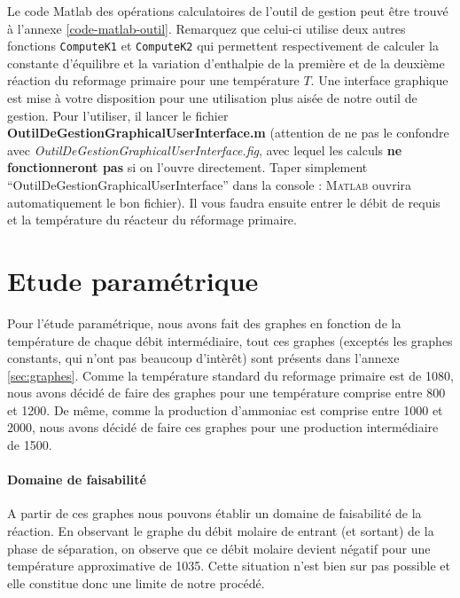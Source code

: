 Le code Matlab des opérations calculatoires de l'outil de gestion peut être trouvé à l'annexe \ref{code-matlab-outil}.
Remarquez que celui-ci utilise deux autres fonctions \lstinline{ComputeK1}
et \lstinline{ComputeK2} qui permettent respectivement de calculer la constante
d'équilibre et la variation d'enthalpie de la première et de la deuxième
réaction du reformage primaire pour une température $T$.
Une interface graphique est mise à votre disposition pour une utilisation plus aisée de notre outil de gestion.
Pour l'utiliser, il lancer le fichier \textbf{OutilDeGestionGraphicalUserInterface.m}
(attention de ne pas le confondre avec \textit{OutilDeGestionGraphicalUserInterface.fig},
avec lequel les calculs \textbf{ne fonctionneront pas} si on l'ouvre directement. Taper simplement
``OutilDeGestionGraphicalUserInterface'' dans la console : \textsc{Matlab}
ouvrira automatiquement le bon fichier). Il vous faudra ensuite entrer le débit de
 requis et la température du réacteur du réformage primaire.

\section{Etude paramétrique}
Pour l'étude paramétrique, nous avons fait des
graphes en fonction de la température de chaque
débit intermédiaire, tout ces graphes (exceptés
les graphes constants, qui n'ont pas beaucoup
d'intèrêt) sont présents dans l'annexe 
\ref{sec:graphes}. Comme la température
standard du reformage primaire est de 
\unit{1080}{\kelvin}, nous avons décidé
de faire des graphes pour une température
comprise entre 800 et \unit{1200}{\kelvin}.
De même, comme la production d'ammoniac
est comprise entre 1000 et \unit{2000}{\ton\per\dday},
nous avons décidé de faire ces graphes pour
une production intermédiaire de 
\unit{1500}{\ton\per\dday}.

\paragraph{Domaine de faisabilité}
A partir de ces graphes nous pouvons
établir un domaine de faisabilité de
la réaction. En observant le graphe
du débit molaire de  entrant
(et sortant) de la phase de séparation,
on observe que ce débit molaire
devient négatif pour une température
approximative de \unit{1035}{\kelvin}.
Cette situation n'est bien sur pas
possible et elle constitue donc une
limite de notre procédé.

